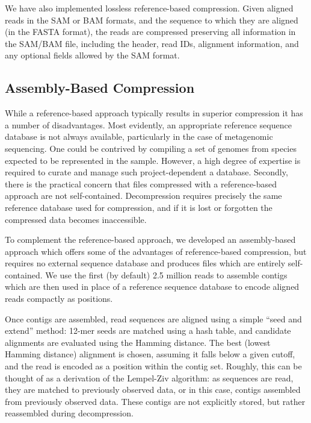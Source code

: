\documentclass[twocolumn]{article}
\begin{document}
We have also implemented lossless reference-based compression. Given aligned
reads in the SAM or BAM formats, and the sequence to which they are aligned
(in the FASTA format), the reads are compressed preserving all information in
the SAM/BAM file, including the header, read IDs, alignment information, and
any optional fields allowed by the SAM format.


\subsection{Assembly-Based Compression}

While a reference-based approach typically results in superior compression it
has a number of disadvantages. Most evidently, an appropriate reference
sequence database is not always available, particularly in the case of metagenomic
sequencing. One could be contrived by compiling a set of genomes from species
expected to be represented in the sample. However, a high degree of expertise
is required to curate and manage such project-dependent a database. Secondly,
there is the practical concern that files compressed with a reference-based
approach are not self-contained. Decompression requires precisely the same
reference database used for compression, and if it is lost or forgotten the
compressed data becomes inaccessible.

To complement the reference-based approach, we developed an assembly-based
approach which offers some of the advantages of reference-based compression,
but requires no external sequence database and produces files which are
entirely self-contained. We use the first (by default) 2.5 million reads to
assemble contigs which are then used in place of a reference sequence
database to encode aligned reads compactly as positions.

Once contigs are assembled, read sequences are aligned using a simple ``seed
and extend'' method: 12-mer seeds are matched using a hash table, and
candidate alignments are evaluated using the Hamming distance. The best
(lowest Hamming distance) alignment is chosen, assuming it falls below a given
cutoff, and the read is encoded as a position within the contig set. Roughly,
this can be thought of as a derivation of the Lempel-Ziv algorithm: as
sequences are read, they are matched to previously observed data, or in this
case, contigs assembled from previously observed data. These contigs are
not explicitly stored, but rather reassembled during decompression.


\end{document}
